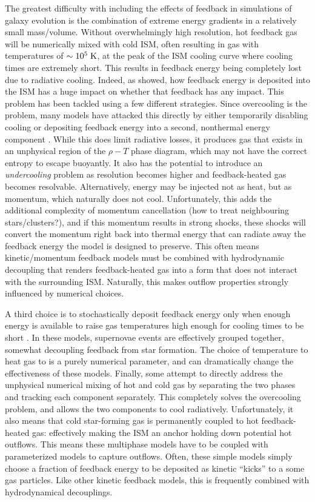 The greatest difficulty with including the effects of feedback in simulations of
galaxy evolution is the combination of extreme energy gradients in a relatively
small mass/volume.  Without overwhelmingly high resolution, hot feedback gas
will be numerically mixed with cold ISM, often resulting in gas with
temperatures of $\sim10^5\;\rm{K}$, at the peak of the ISM cooling curve where
cooling times are extremely short.  This results in feedback energy being
completely lost due to radiative cooling.  Indeed, as \citet{Thacker2000}
showed, how feedback energy is deposited into the ISM has a huge impact on
whether that feedback has any impact.  This problem has been tackled using a few
different strategies.  Since overcooling is the problem, many models have
attacked this directly by either temporarily disabling cooling
\citep{Stinson2006} or depositing feedback energy into a second, nonthermal
energy component \citep{Agertz2013}.  While this does limit radiative losses, it
produces gas that exists in an unphysical region of the $\rho-T$ phase diagram,
which may not have the correct entropy to escape buoyantly.  It also has the
potential to introduce an \textit{undercooling} problem as resolution becomes
higher and feedback-heated gas becomes resolvable.  Alternatively, energy may be
injected not as heat, but as momentum, which naturally does not cool.
Unfortunately, this adds the additional complexity of momentum cancellation (how
to treat neighbouring stars/clusters?), and if this momentum results in strong
shocks, these shocks will convert the momentum right back into thermal energy
that can radiate away the feedback energy the model is designed to preserve.
This often means kinetic/momentum feedback models must be combined with
hydrodynamic decoupling that renders feedback-heated gas into a form that does
not interact with the surrounding ISM.  Naturally, this makes outflow properties
strongly influenced by numerical choices.  

A third choice is to stochastically deposit feedback energy only when enough
energy is available to raise gas temperatures high enough for cooling times to
be short \citep{DallaVecchia2012,Crain2015}.  In these models, supernovae events
are effectively grouped together, somewhat decoupling feedback from star
formation.  The choice of temperature to heat gas to is a purely numerical
parameter, and can dramatically change the effectiveness of these models.
Finally, some \citep{Springel2010} attempt to directly address the unphysical
numerical mixing of hot and cold gas by separating the two phases and tracking
each component separately.  This completely solves the overcooling problem, and
allows the two components to cool radiatively.   Unfortunately, it also means
that cold star-forming gas is permanently coupled to hot feedback-heated gas:
effectively making the ISM an anchor holding down potential hot outflows.  This
means these multiphase models have to be coupled with parameterized models to
capture outflows.  Often, these simple models simply choose a fraction of
feedback energy to be deposited as kinetic ``kicks'' to a some gas particles.
Like other kinetic feedback models, this is frequently combined with
hydrodynamical decouplings.

